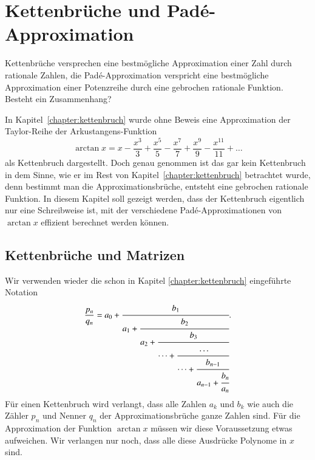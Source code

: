 %
%
%
\chapter{Kettenbrüche und Padé-Approximation\label{chapter:arctan}}
\begin{refsection}

{\parindent0pt
Kettenbrüche} versprechen eine bestmögliche Approximation einer Zahl durch
rationale Zahlen, die Padé-Approximation verspricht eine bestmögliche
Approximation einer Potenzreihe durch eine gebrochen rationale Funktion.
Besteht ein Zusammenhang?

In Kapitel~\ref{chapter:kettenbruch} wurde ohne Beweis eine Approximation der 
Taylor-Reihe der Arkustangens-Funktion
\begin{equation}
\arctan x
=
x-\frac{x^3}{3}+\frac{x^5}{5}-\frac{x^7}{7}+\frac{x^9}{9}-\frac{x^{11}}{11}
+\dots
\label{arctan:arctan}
\end{equation}
als Kettenbruch dargestellt.
Doch genau genommen ist das gar kein Kettenbruch in dem Sinne, wie er
im Rest von Kapitel~\ref{chapter:kettenbruch} betrachtet wurde, denn
bestimmt man die Approximationsbrüche, entsteht eine gebrochen rationale
Funktion.
In diesem Kapitel soll gezeigt werden, dass der Kettenbruch eigentlich
nur eine Schreibweise ist, mit der verschiedene Padé-Approximationen von
$\arctan x$ effizient berechnet werden können.

\section{Kettenbrüche und Matrizen
\label{arctan:section:matrizen}}
Wir verwenden wieder die schon in Kapitel \ref{chapter:kettenbruch}
eingeführte Notation
\[
\frac{p_n}{q_n}
=
a_0 +
\cfrac{b_1}{
a_1+\cfrac{b_2}{
a_2+\cfrac{b_3}{
\dots+\cfrac{\dots}{\dots+\cfrac{b_{n-1}}{a_{n-1}+\cfrac{b_n}{a_n}}}}}}.
\]
Für einen Kettenbruch wird verlangt, dass alle Zahlen $a_k$ und $b_k$ 
wie auch die Zähler $p_n$ und Nenner $q_n$ der Approximationsbrüche
ganze Zahlen sind.
Für die Approximation der Funktion $\arctan x$ müssen wir
diese Voraussetzung etwas aufweichen.
Wir verlangen nur noch, dass alle diese Ausdrücke Polynome in $x$ sind.


\end{refsection}
